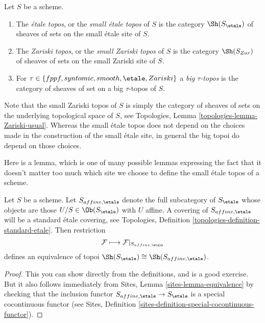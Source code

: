 \begin{definition}
\label{definition-etale-topos}
Let $S$ be a scheme.
\begin{enumerate}
\item The {\it \'etale topos}, or the {\it small \'etale topos}
of $S$ is the category $\Sh(S_\etale)$ of sheaves of sets on
the small \'etale site of $S$.
\item The {\it Zariski topos}, or the {\it small Zariski topos}
of $S$ is the category $\Sh(S_{Zar})$ of sheaves of sets on the
small Zariski site of $S$.
\item For $\tau \in \{fppf, syntomic, smooth, \etale, Zariski\}$ a
{\it big $\tau$-topos} is the category of sheaves of set on a
big $\tau$-topos of $S$.
\end{enumerate}
\end{definition}

\noindent
Note that the small Zariski topos of $S$ is simply the category of sheaves
of sets on the underlying topological space of $S$, see
Topologies, Lemma \ref{topologies-lemma-Zariski-usual}.
Whereas the small \'etale topos does not depend on the choices made in the
construction of the small \'etale site, in general the big topoi do depend
on those choices.

\medskip\noindent
Here is a lemma, which is one of many possible lemmas expressing the
fact that it doesn't matter too much which site we choose to define
the small \'etale topos of a scheme.

\begin{lemma}
\label{lemma-alternative}
Let $S$ be a scheme. Let $S_{affine, \etale}$ denote the
full subcategory of $S_\etale$
whose objects are those $U/S \in \Ob(S_\etale)$ with
$U$ affine. A covering of $S_{affine, \etale}$ will be a standard
\'etale covering, see
Topologies, Definition \ref{topologies-definition-standard-etale}.
Then restriction
$$
\mathcal{F} \longmapsto \mathcal{F}|_{S_{affine, \etale}}
$$
defines an equivalence of topoi
$\Sh(S_\etale) \cong \Sh(S_{affine, \etale})$.
\end{lemma}

\begin{proof}
This you can show directly from the definitions, and is a good exercise.
But it also follows immediately from
Sites, Lemma \ref{sites-lemma-equivalence}
by checking that the inclusion functor
$S_{affine, \etale} \to S_\etale$
is a special cocontinuous functor (see
Sites, Definition \ref{sites-definition-special-cocontinuous-functor}).
\end{proof}

